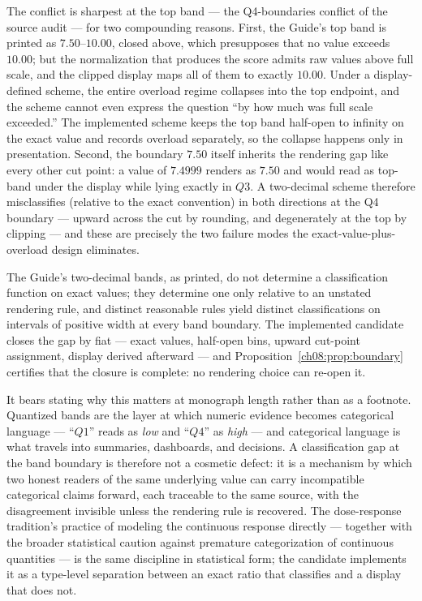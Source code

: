 The conflict is sharpest at the top band --- the Q4-boundaries conflict of
the source audit --- for two compounding reasons. First, the Guide's top
band is printed as $7.50$--$10.00$, closed above, which presupposes that
no value exceeds $10.00$; but the normalization that produces the score
admits raw values above full scale, and the clipped display maps all of
them to exactly $10.00$. Under a display-defined scheme, the entire
overload regime collapses into the top endpoint, and the scheme cannot
even express the question ``by how much was full scale exceeded.'' The
implemented scheme keeps the top band half-open to infinity on the exact
value and records overload separately, so the collapse happens only in
presentation. Second, the boundary $7.50$ itself inherits the rendering
gap like every other cut point: a value of $7.4999$ renders as $7.50$ and
would read as top-band under the display while lying exactly in $Q3$. A
two-decimal scheme therefore misclassifies (relative to the exact
convention) in both directions at the Q4 boundary --- upward across the
cut by rounding, and degenerately at the top by clipping --- and these are
precisely the two failure modes the exact-value-plus-overload design
eliminates.

\begin{finding}\label{ch08:find:display}
The Guide's two-decimal bands, as printed, do not determine a
classification function on exact values; they determine one only relative
to an unstated rendering rule, and distinct reasonable rules yield
distinct classifications on intervals of positive width at every band
boundary. The implemented candidate closes the gap by fiat --- exact
values, half-open bins, upward cut-point assignment, display derived
afterward --- and Proposition~\ref{ch08:prop:boundary} certifies that the
closure is complete: no rendering choice can re-open it.
\end{finding}

It bears stating why this matters at monograph length rather than as a
footnote. Quantized bands are the layer at which numeric evidence becomes
categorical language --- ``$Q1$'' reads as \emph{low} and ``$Q4$'' as
\emph{high} --- and categorical language is what travels into summaries,
dashboards, and decisions. A classification gap at the band boundary is
therefore not a cosmetic defect: it is a mechanism by which two honest
readers of the same underlying value can carry incompatible categorical
claims forward, each traceable to the same source, with the disagreement
invisible unless the rendering rule is recovered. The dose-response
tradition's practice of modeling the continuous response directly
\cite{ritz} --- together with the broader statistical caution against
premature categorization of continuous quantities --- is the same
discipline in statistical form;
the candidate implements it as a type-level separation between an exact
ratio that classifies and a display that does not.

